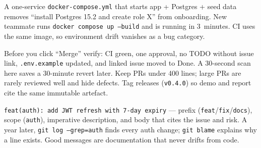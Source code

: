 \begin{example}
A one-service \texttt{docker-compose.yml} that starts app + Postgres + seed data removes ``install Postgres 15.2 and create role X'' from onboarding. New teammate runs \texttt{docker compose up --build} and is running in 3~minutes. CI uses the same image, so environment drift vanishes as a bug category.
\end{example}

\begin{remark}
Before you click ``Merge'' verify: CI green, one approval, no TODO without issue link, \texttt{.env.example} updated, and linked issue moved to Done. A 30-second scan here saves a 30-minute revert later. Keep PRs under 400 lines; large PRs are rarely reviewed well and hide defects. Tag releases (\texttt{v0.4.0}) so demo and report cite the same immutable artefact.
\end{remark}

\begin{example}
\texttt{feat(auth): add JWT refresh with 7-day expiry} --- prefix (\texttt{feat}/\texttt{fix}/\texttt{docs}), scope (\texttt{auth}), imperative description, and body that cites the issue and risk. A year later, \texttt{git log --grep=auth} finds every auth change; \texttt{git blame} explains why a line exists. Good messages are documentation that never drifts from code.
\end{example}

